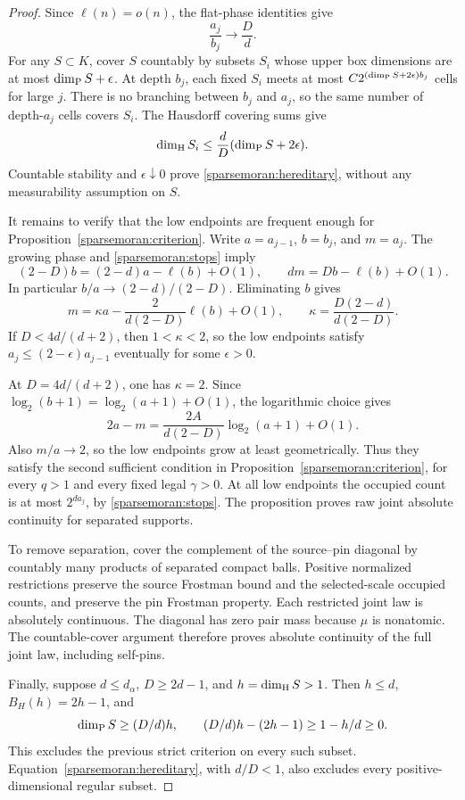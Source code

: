 \begin{proof}
Since \(\ell(n)=o(n)\), the flat-phase identities give
\[
 \frac{a_j}{b_j}\longrightarrow\frac Dd.
\]
For any \(S\subset K\), cover \(S\) countably by subsets \(S_i\)
whose upper box dimensions are at most \(\dim_{\mathrm P} S+\epsilon\).
At depth \(b_j\), each fixed \(S_i\) meets at most
\(C2^{(\dim_{\mathrm P} S+2\epsilon)b_j}\) cells for large \(j\).
There is no branching between \(b_j\) and \(a_j\), so the same
number of depth-\(a_j\) cells covers \(S_i\).
The Hausdorff covering sums give
\[
 \dim_{\mathrm H} S_i\le\frac dD(\dim_{\mathrm P} S+2\epsilon).
\]
Countable stability and \(\epsilon\downarrow0\) prove
\eqref{sparsemoran:hereditary}, without any measurability assumption
on \(S\).

It remains to verify that the low endpoints are frequent enough
for Proposition~\ref{sparsemoran:criterion}. Write
\(a=a_{j-1}\), \(b=b_j\), and \(m=a_j\). The growing phase and
\eqref{sparsemoran:stops} imply
\[
 (2-D)b=(2-d)a-\ell(b)+O(1),\qquad
 dm=Db-\ell(b)+O(1).
\]
In particular \(b/a\to(2-d)/(2-D)\). Eliminating \(b\) gives
\begin{equation}\label{sparsemoran:recurrence}
 m=\kappa a-\frac{2}{d(2-D)}\ell(b)+O(1),
 \qquad
 \kappa=\frac{D(2-d)}{d(2-D)}.
\end{equation}
If \(D<4d/(d+2)\), then \(1<\kappa<2\), so the low endpoints
satisfy \(a_j\le(2-\epsilon)a_{j-1}\) eventually for some
\(\epsilon>0\).

At \(D=4d/(d+2)\), one has \(\kappa=2\). Since
\(\log_2(b+1)=\log_2(a+1)+O(1)\), the logarithmic choice gives
\begin{equation}\label{sparsemoran:endpointgap}
 2a-m=\frac{2A}{d(2-D)}\log_2(a+1)+O(1).
\end{equation}
Also \(m/a\to2\), so the low endpoints grow at least geometrically.
Thus they satisfy the second sufficient condition in
Proposition~\ref{sparsemoran:criterion}, for every \(q>1\) and every
fixed legal \(\gamma>0\). At all low endpoints the occupied count
is at most \(2^{da_j}\), by \eqref{sparsemoran:stops}.
The proposition proves raw joint absolute continuity for separated
supports.

To remove separation, cover the complement of the source--pin
diagonal by countably many products of separated compact balls.
Positive normalized restrictions preserve the source Frostman
bound and the selected-scale occupied counts, and preserve the
pin Frostman property. Each restricted joint law is absolutely
continuous. The diagonal has zero pair mass because \(\mu\) is
nonatomic. The countable-cover argument therefore proves absolute
continuity of the full joint law, including self-pins.

Finally, suppose \(d\le d_\alpha\), \(D\ge2d-1\), and
\(h=\dim_{\mathrm H} S>1\). Then \(h\le d\), \(B_H(h)=2h-1\), and
\[
 \dim_{\mathrm P} S\ge(D/d)h,\qquad
 (D/d)h-(2h-1)\ge1-h/d\ge0.
\]
This excludes the previous strict criterion on every such subset.
Equation~\eqref{sparsemoran:hereditary}, with \(d/D<1\), also
excludes every positive-dimensional regular subset.
\end{proof}

